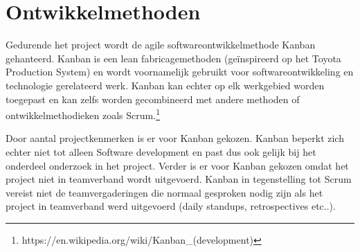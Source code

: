 \chapter{Ontwikkelmethoden}\label{chap:projectmethod}
Gedurende het project wordt de agile softwareontwikkelmethode Kanban gehanteerd. Kanban is een lean fabricagemethoden (geïnspireerd op het Toyota Production System) en wordt voornamelijk gebruikt voor softwareontwikkeling en technologie gerelateerd werk. Kanban kan echter op elk werkgebied worden toegepast en kan zelfs worden gecombineerd met andere methoden of ontwikkelmethodieken zoals Scrum.\footnote{https://en.wikipedia.org/wiki/Kanban\_(development)}\par

Door aantal projectkenmerken is er voor Kanban gekozen. Kanban beperkt zich echter niet tot alleen Software development en past dus ook gelijk bij het onderdeel onderzoek in het project. Verder is er voor Kanban gekozen omdat het project niet in teamverband wordt uitgevoerd. Kanban in tegenstelling tot Scrum vereist niet de teamvergaderingen die normaal gesproken nodig zijn als het project in teamverband werd uitgevoerd (daily standups, retrospectives etc..).\par

